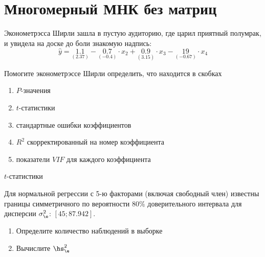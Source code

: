 \documentclass[pdftex,11pt,openany]{book}\usepackage[]{graphicx}\usepackage[]{color}
\begin{document}
\chapter{Многомерный МНК без матриц}



\begin{problem} %
 Эконометрэсса Ширли зашла в пустую аудиторию, где царил приятный полумрак, и увидела на доске до боли знакомую надпись:
\[
\hat{y}=\underset{(2.37)}{1.1}-\underset{(-0.4)}{0.7}\cdot x_2+\underset{(3.15)}{0.9}\cdot x_3-\underset{(-0.67)}{19}\cdot x_4
\]

Помогите эконометрэссе Ширли определить, что находится в скобках 
\begin{enumerate}
\item $P$-значения
\item $t$-статистики
\item стандартные ошибки коэффициентов
\item $R^2$ скорректированный на номер коэффициента
\item показатели $VIF$ для каждого коэффициента
\end{enumerate}
\end{problem}

\begin{solution}
$t$-статистики
\end{solution}

\begin{problem}  %
 Для нормальной регрессии с 5-ю факторами (включая свободный член) известны границы симметричного по вероятности 80$\%$ доверительного интервала для дисперсии $\sigma_{\e}^2$: $[45; 87.942]$.

\begin{enumerate}
\item Определите количество наблюдений в выборке
\item Вычислите $\hs_{\e}^2$
\end{enumerate}
\end{problem}
 
\end{document}
